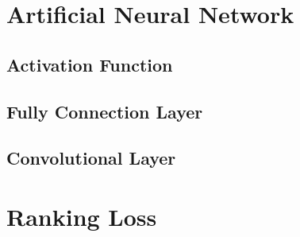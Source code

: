 \section{Artificial Neural Network}
\subsection{Activation Function}
\subsection{Fully Connection Layer}
\subsection{Convolutional Layer}

\section{Ranking Loss}
